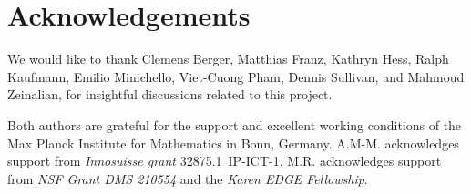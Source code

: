 
\section*{Acknowledgements}

We would like to thank Clemens Berger, Matthias Franz, Kathryn Hess, Ralph Kaufmann, Emilio Minichello, Viet-Cuong Pham, Dennis Sullivan, and Mahmoud Zeinalian, for insightful discussions related to this project.

Both authors are grateful for the support and excellent working conditions of the Max Planck Institute for Mathematics in Bonn, Germany.
A.M-M. acknowledges support from \textit{Innosuisse grant} \mbox{32875.1 IP-ICT-1}.
M.R. acknowledges support from \textit{NSF Grant DMS 210554} and the \textit{Karen EDGE Fellowship}.